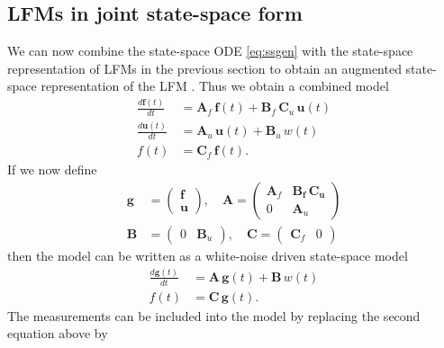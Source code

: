 \documentclass[journal]{IEEEtran}
\begin{document}
\subsection{LFMs in joint state-space form}
%
We can now combine the  state-space ODE \eqref{eq:ssgen} with the state-space representation of LFMs in the previous section to obtain an augmented state-space representation of the LFM \cite{Hartikainen+Sarkka:2011,Hartikainen+Seppanen+Sarkka:2012}. Thus we obtain a combined model
%
\begin{equation}
\begin{split}
  \frac{d\mathbf{f}(t)}{dt}
  &= \mathbf{A}_f \, \mathbf{f}(t)
  + \mathbf{B}_f \, \mathbf{C}_u \, \mathbf{u}(t) \\
  \frac{d\mathbf{u}(t)}{dt}
  &= \mathbf{A}_u \, \mathbf{u}(t) + \mathbf{B}_u \, w(t) \\
  f(t) &= \mathbf{C}_f \, \mathbf{f}(t).
\end{split}
\label{eq:comb}
\end{equation}
%
If we now define
%
\begin{equation}
\begin{split}
  \mathbf{g} &= \begin{pmatrix}
	\mathbf{f} \\ \mathbf{u}
  \end{pmatrix}, \quad
  \mathbf{A}
  = \begin{pmatrix}
	\mathbf{A}_f & \mathbf{\mathbf{B}_f \, \mathbf{C}_u} \\
	0 & \mathbf{A}_u
  \end{pmatrix} \\
  \mathbf{B}
  &= \begin{pmatrix}
	0 & \mathbf{B}_u
  \end{pmatrix}, \quad
  \mathbf{C}
  = \begin{pmatrix}
	\mathbf{C}_f & 0
  \end{pmatrix}
\end{split}
\label{eq:ssaugmats}
\end{equation}
%
then the model can be written as a white-noise driven state-space model
%
\begin{equation}
\begin{split}
  \frac{d\mathbf{g}(t)}{dt}
  &= \mathbf{A} \, \mathbf{g}(t)
  + \mathbf{B} \, w(t) \\
  f(t) &= \mathbf{C} \, \mathbf{g}(t).
\end{split}
\label{eq:ssaug}
\end{equation}
%
The measurements can be included into the model by replacing the second equation above by
\end{document}
